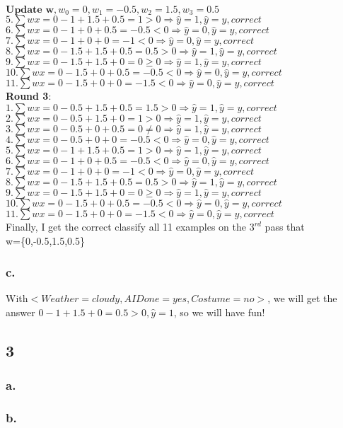 \documentclass{article}
\begin{document}
		$\textbf{Update\ w},w_0=0,w_1=-0.5,w_2=1.5,w_3=0.5$\\
		$5.\sum wx=0-1+1.5+0.5=1>0\Rightarrow\hat{y}=1,\hat{y}=y,correct$\\
		$6.\sum wx=0-1+0+0.5=-0.5<0\Rightarrow\hat{y}=0,\hat{y}=y,correct$\\
		$7.\sum wx=0-1+0+0=-1<0\Rightarrow\hat{y}=0,\hat{y}=y,correct$\\
		$8.\sum wx=0-1.5+1.5+0.5=0.5>0\Rightarrow\hat{y}=1,\hat{y}=y,correct$\\
		$9.\sum wx=0-1.5+1.5+0=0\geq 0\Rightarrow\hat{y}=1,\hat{y}=y,correct$\\
		$10.\sum wx=0-1.5+0+0.5=-0.5<0\Rightarrow\hat{y}=0,\hat{y}=y,correct$\\
		$11.\sum wx=0-1.5+0+0=-1.5<0\Rightarrow\hat{y}=0,\hat{y}=y,correct$\\
		\textbf{Round 3}:\\
		$1.\sum wx=0-0.5+1.5+0.5=1.5>0\Rightarrow\hat{y}=1,\hat{y}=y,correct$\\
                $2.\sum wx=0-0.5+1.5+0=1>0\Rightarrow\hat{y}=1,\hat{y}=y,correct$\\	
                $3.\sum wx=0-0.5+0+0.5=0\neq 0\Rightarrow\hat{y}=1,\hat{y}=y,correct$\\
		$4.\sum wx=0-0.5+0+0=-0.5<0\Rightarrow\hat{y}=0,\hat{y}=y,correct$\\
		$5.\sum wx=0-1+1.5+0.5=1>0\Rightarrow\hat{y}=1,\hat{y}=y,correct$\\
		$6.\sum wx=0-1+0+0.5=-0.5<0\Rightarrow\hat{y}=0,\hat{y}=y,correct$\\
		$7.\sum wx=0-1+0+0=-1<0\Rightarrow\hat{y}=0,\hat{y}=y,correct$\\
		$8.\sum wx=0-1.5+1.5+0.5=0.5>0\Rightarrow\hat{y}=1,\hat{y}=y,correct$\\
		$9.\sum wx=0-1.5+1.5+0=0\geq 0\Rightarrow\hat{y}=1,\hat{y}=y,correct$\\
		$10.\sum wx=0-1.5+0+0.5=-0.5<0\Rightarrow\hat{y}=0,\hat{y}=y,correct$\\
		$11.\sum wx=0-1.5+0+0=-1.5<0\Rightarrow\hat{y}=0,\hat{y}=y,correct$\\
		Finally, I get the correct classify all 11 examples on the $3^{rd}$ pass that\\
		w=\{0,-0.5,1.5,0.5\}
	    \subsubsection{c.}
		With$<Weather=cloudy, AIDone=yes, Costume=no>$, we will get the answer $0-1+1.5+0=0.5>0,\hat{y}=1$, so we will have fun!
        \subsection{3}
            \subsubsection{a.}
            \subsubsection{b.}
\end{document}
